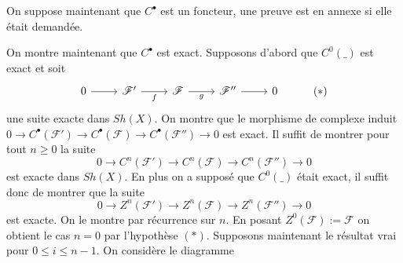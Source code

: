 \documentclass[a4paper,12pt]{article}
\newcommand{\F}{\mathscr F}
\theoremstyle{plain}
\theoremstyle{definition}
\theoremstyle{remark}
\begin{document}
On suppose maintenant que $C^\bullet$ est un foncteur, une 
preuve est en annexe si elle était demandée.
\newline

On montre maintenant que $C^\bullet$ est exact. Supposons d'abord que $C^0(\_)$ est exact et soit 
\[\begin{tikzcd}
	0 & {\F'} & \F & {\F''} & 0 & {(*)}
	\arrow[from=1-1, to=1-2]
	\arrow["f"', from=1-2, to=1-3]
	\arrow["g"', from=1-3, to=1-4]
	\arrow[from=1-4, to=1-5]
\end{tikzcd}\]
une suite exacte dans $Sh(X)$. On montre que le morphisme de complexe
induit $0\to C^\bullet(\F')\to C^\bullet(\F)\to C^\bullet(\F'')\to 0$
est exact. Il suffit de montrer pour tout $n\geq 0$ la suite
\[0\to C^n(\F')\to C^n(\F)\to C^n(\F'')\to 0\]
est exacte dans $Sh(X)$. En plus on a supposé que $C^0(\_)$ était exact,
il suffit donc de montrer que la suite
\[0\to Z^n(\F')\to Z^n(\F)\to Z^n(\F'')\to 0\]
est exacte. On le montre par récurrence sur $n$. En posant $Z^0(\F):=\F$
on obtient le cas $n=0$ par l'hypothèse $(*)$. Supposons 
maintenant le résultat vrai pour $0\leq i\leq n-1$.
On considère le diagramme 
\end{document}
